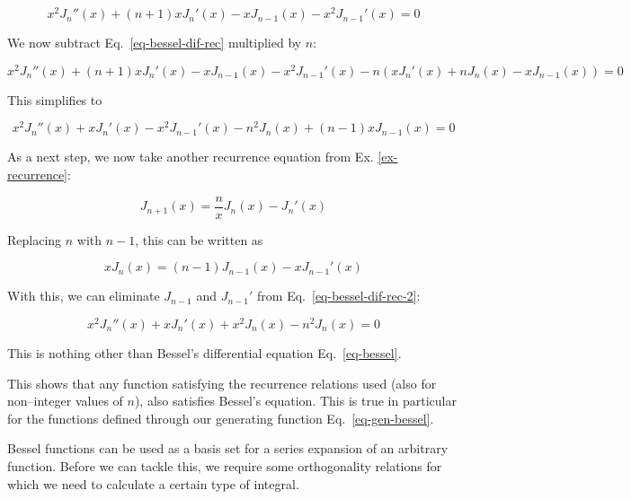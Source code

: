 \begin{equation}
x^2 J_n''(x) + (n + 1) x J_n'(x) - x J_{n-1}(x) - x^2 J_{n-1}'(x)= 0
\end{equation} 

We now subtract Eq.~\ref{eq-bessel-dif-rec} multiplied by $n$:

\begin{equation}
x^2 J_n''(x) + (n + 1) x J_n'(x) - x J_{n-1}(x) - x^2 J_{n-1}'(x) - n\left(x J_n'(x) + n J_n(x) - x J_{n-1}(x)\right)= 0
\end{equation} 

This simplifies to

\begin{equation}
x^2 J_n''(x) +  x J_n'(x) - x^2 J_{n-1}'(x) - n^2 J_n(x) + (n - 1) x J_{n-1}(x)= 0 \label{eq-bessel-dif-rec-2}
\end{equation} 

As a next step, we now take another recurrence equation from Ex. \ref{ex-recurrence}:

\begin{equation}
J_{n+1}(x) = \frac{n}{x}J_n(x) - J_n'(x)
\end{equation} 

Replacing $n$ with $n-1$, this can be written as

\begin{equation}
x J_{n}(x) = (n-1)J_{n-1}(x) - x J_{n-1}'(x)
\end{equation} 

With this, we can eliminate $J_{n-1}$ and $J_{n-1}'$ from Eq.~\ref{eq-bessel-dif-rec-2}:

\begin{equation}
x^2 J_n''(x) +  x J_n'(x) + x^2 J_n(x) - n^2 J_n(x) = 0
\end{equation} 

This is nothing other than Bessel's differential equation Eq.~\ref{eq-bessel}.

This shows that any function satisfying the recurrence relations used (also for non--integer values of $n$), also satisfies Bessel's equation. This is true in particular for the functions defined through our generating function Eq.~\ref{eq-gen-bessel}.


Bessel functions can be used as a basis set for a series expansion of an arbitrary function. Before we can tackle this, we require some orthogonality relations for which we need to calculate a certain type of integral.

